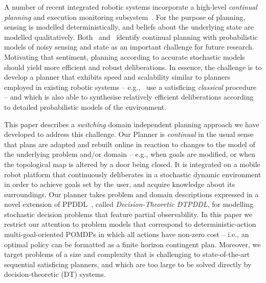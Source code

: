 



A number of recent integrated robotic systems incorporate a
high-level {\em continual planning} and execution monitoring
subsystem~\cite{wyattetal2010tamd,talamadupula:2010,Kraft2008}.
For the purpose of planning, sensing is modelled
deterministically, and beliefs about the underlying state are
modelled qualitatively.
Both~\citeauthor{talamadupula:2010} and~\citeauthor{wyattetal2010tamd}
identify
continual planning with probabilistic
models of noisy sensing and state as an important challenge for future
research.
Motivating that sentiment, planning according to accurate
stochastic models should yield more efficient and robust
deliberations.
In essence, the challenge is to develop a planner that
exhibits speed and scalability similar to planners employed in
existing robotic systems -- e.g.,~\citeauthor{wyattetal2010tamd} use a
satisficing {\em classical} procedure -- and which is also able to
synthesise relatively efficient deliberations according to detailed
probabilistic models of the environment.


This paper describes a {\em switching} domain independent planning
approach we have developed to address this challenge. 
Our Planner is {\em continual} in the usual sense that plans are
adapted and rebuilt online in reaction to changes to the model of the
underlying problem and/or domain -- e.g., when goals are
modified, or when the topological map is altered by a door being
closed.
It is integrated on a mobile robot platform that continuously
deliberates in a stochastic dynamic environment in order to achieve
goals set by the user, and acquire knowledge about its surroundings.
Our planner takes problem and domain descriptions expressed in a novel
extension of PPDDL~\cite{younes:etal:2005}, called {\em
Decision-Theoretic DTPDDL}, for modelling stochastic decision problems
that feature partial observability.  In this paper we restrict our
attention to problem models that correspond to deterministic-action
multi-goal-oriented POMDPs%
in which all actions have
non-zero cost -- i.e., an optimal policy can be formatted as a finite
horizon contingent plan. Moreover, we target problems of a size and
complexity that is challenging to state-of-the-art sequential
satisficing planners, and which are too large to be solved directly by
decision-theoretic (DT) systems.

